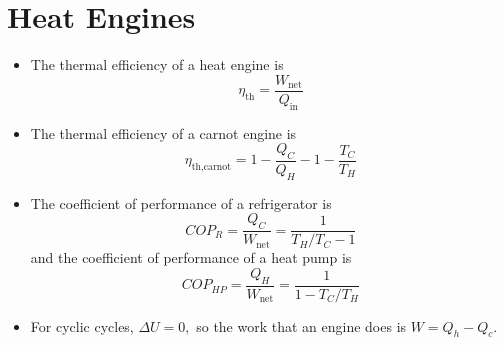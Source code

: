 \documentclass{article}
\begin{document}
\section{Heat Engines}
\begin{itemize}
    \item The thermal efficiency of a heat engine is 
    \begin{equation}
        \eta_\text{th} = \frac{W_\text{net}}{Q_\text{in}}
    \end{equation}
    \item The thermal efficiency of a carnot engine is 
    \begin{equation}
        \eta_\text{th,carnot} = 1-\frac{Q_C}{Q_H}-1-\frac{T_C}{T_H}
    \end{equation}
    \item The coefficient of performance of a refrigerator is 
    \begin{equation}
        COP_R = \frac{Q_C}{W_\text{net}} = \frac{1}{T_H/T_C-1}
    \end{equation}
    and the coefficient of performance of a heat pump is 
    \begin{equation}
        COP_{HP} = \frac{Q_H}{W_\text{net}} = \frac{1}{1-T_C/T_H}
    \end{equation}
    \item For cyclic cycles, $\Delta U=0,$ so the work that an engine does is $W=Q_h-Q_c$.
\end{itemize}
\end{document}
